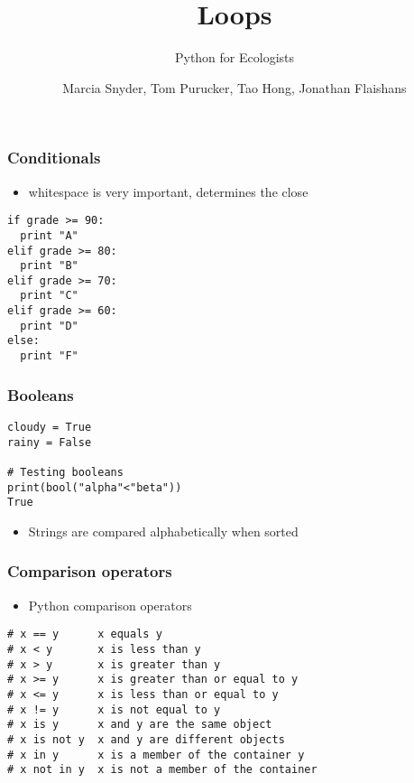 \documentclass{beamer}
\title[Title1]{Loops}
\subtitle[Title2]{Python for Ecologists}
\author[etal]{Marcia Snyder, Tom Purucker, Tao Hong, Jonathan Flaishans}
\institute[EPA]{
  Ecological Society of America Workshop\\
  Portland, OR\\[1ex]
  \texttt{purucker.tom@gmail.com}
}
\newcommand\Fontvi{\fontsize{6}{7.2}\selectfont}
\begin{document}
\begin{frame}[plain]
  \titlepage
\end{frame}




\begin{frame}[fragile]
\frametitle{Conditionals}
\begin{itemize}
\item whitespace is very important, determines the close
\end{itemize}
\begin{lstlisting}
if grade >= 90:
  print "A"
elif grade >= 80:
  print "B"
elif grade >= 70:
  print "C"
elif grade >= 60:
  print "D"
else:
  print "F"  
\end{lstlisting} 
\end{frame}

\begin{frame}[fragile]
\frametitle{Booleans}
\begin{lstlisting}
cloudy = True
rainy = False

# Testing booleans
print(bool("alpha"<"beta"))
True
\end{lstlisting}
\begin{itemize}
\item Strings are compared alphabetically when sorted
\end{itemize}
\end{frame}

\begin{frame}[fragile]
\frametitle{Comparison operators}
\begin{itemize}
\item Python comparison operators
\end{itemize}
\begin{lstlisting}
# x == y      x equals y
# x < y       x is less than y
# x > y       x is greater than y
# x >= y      x is greater than or equal to y
# x <= y      x is less than or equal to y
# x != y      x is not equal to y
# x is y      x and y are the same object
# x is not y  x and y are different objects
# x in y      x is a member of the container y
# x not in y  x is not a member of the container
\end{lstlisting}
\end{frame}
\end{document}
